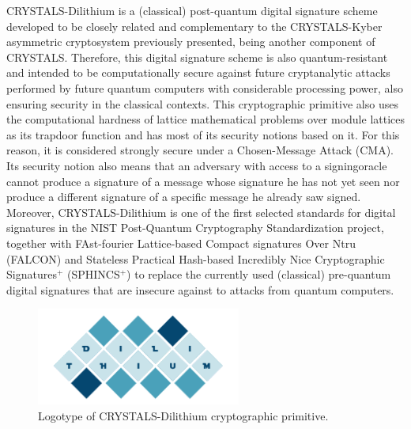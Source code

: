 \documentclass[runningheads]{llncs}
\numberwithin{equation}{section}
\begin{document}
    CRYSTALS-Dilithium is a (classical) post-quantum digital signature scheme developed to be closely related and complementary to the CRYSTALS-Kyber asymmetric cryptosystem previously presented, being another component of CRYSTALS. Therefore, this digital signature scheme is also quantum-resistant and intended to be computationally secure against future cryptanalytic attacks performed by future quantum computers with considerable processing power, also ensuring security in the classical contexts. This cryptographic primitive also uses the computational hardness of lattice mathematical problems over module lattices as its trapdoor function and has most of its security notions based on it. For this reason, it is considered strongly secure under a Chosen-Message Attack (CMA). Its security notion also means that an adversary with access to a signing\break oracle cannot produce a signature of a message whose signature he has not yet seen nor produce a different signature of a specific message he already saw signed. Moreover, CRYSTALS-Dilithium is one of the first selected standards for digital signatures in the NIST Post-Quantum Cryptography Standardization project, together with FAst-fourier Lattice-based Compact signatures Over Ntru (FALCON) and Stateless Practical Hash-based Incredibly Nice Cryptographic Signatures${}^{+}$ (SPHINCS${}^{+}$) to replace the currently used (classical) pre-quantum digital signatures that are insecure against to attacks from quantum computers.

    
    \vspace{-3ex}
    \begin{figure}[!ht]
        \centering
        \captionsetup{justification=centering}
        \includegraphics[width=0.6\textwidth]{figures/sections/section-3/crystals-dilithium.pdf}
        \caption{Logotype of CRYSTALS-Dilithium cryptographic primitive.}
        \label{fig:crystals-dilithium-logo}
    \end{figure}
\end{document}
